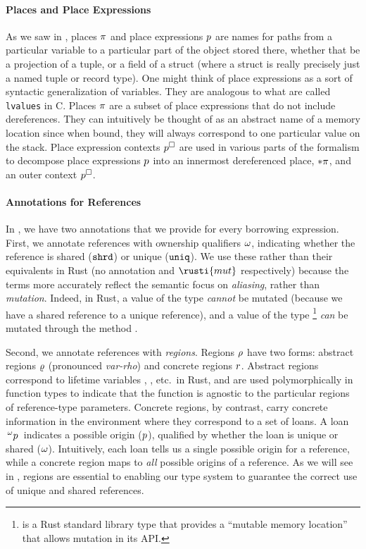 \paragraph{Places and Place Expressions} As we saw in ,
places $\pi$ and place expressions $p$ are names for paths from
a particular variable to a particular part of the object stored there, whether
that be a projection of a tuple, or a field of a struct (where a struct is
really precisely just a named tuple or record type). One might think of place
expressions as a sort of syntactic generalization of variables. They are
analogous to what are called \texttt{lvalues} in C. Places $\pi$ are a
subset of place expressions that do not include dereferences. They can
intuitively be thought of as an abstract name of a memory location since when
bound, they will always correspond to one particular value on the stack. Place
expression contexts $p^\square$ are used in various parts of the formalism
to decompose place expressions $p$ into an innermost dereferenced
place, $* \pi$, and an outer context $p^\square$.

\paragraph{Annotations for References} In \lang, we have two annotations that we
provide for every borrowing expression. First, we annotate references with
ownership qualifiers $\omega$, indicating whether the reference is shared
($\mathtt{shrd}$) or unique ($\mathtt{uniq}$). We use these rather than their equivalents in
Rust (no annotation and $\rusti{mut}$ respectively) because the terms more
accurately reflect the semantic focus on \emph{aliasing}, rather than
\emph{mutation}. Indeed, in Rust, a value of the type 
\emph{cannot} be mutated (because we have a shared reference to a unique
reference), and a value of the type \footnote{
  is a Rust standard library type that provides a ``mutable memory location''
  that allows mutation in its API.} \emph{can} be mutated through the method
.

Second, we annotate references with \emph{regions}. Regions $\rho$ have two
forms: abstract regions $\varrho$ (pronounced \emph{var-rho}) and concrete
regions $r$. Abstract regions correspond to lifetime variables
, , etc.\ in Rust, and are used polymorphically in function
types to indicate that the function is agnostic to the particular regions of
reference-type parameters. Concrete regions, by contrast, carry concrete
information in the environment where they correspond to a set of loans. A loan
$\,^{\omega}p\,$ indicates a possible origin
($p$), qualified by whether the loan is unique or shared ($\omega$).
Intuitively, each loan tells us a single possible origin for a reference, while
a concrete region maps to \emph{all} possible origins of a reference. As we will
see in , regions are essential to enabling our type system to
guarantee the correct use of unique and shared references.

